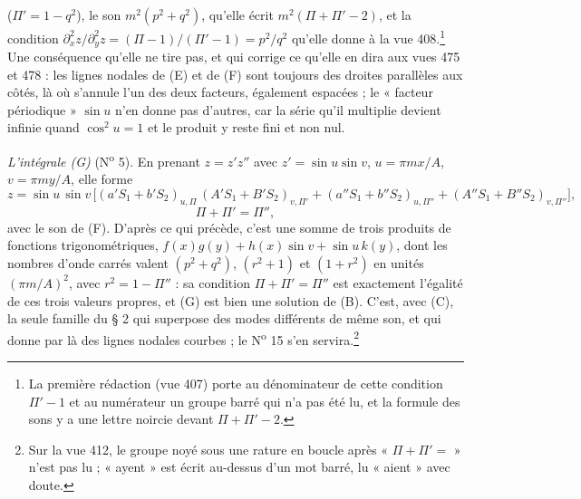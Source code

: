 \documentclass[11pt,a4paper]{article}
\begin{document}
($\Pi' = 1 - q^2$), le son $m^2(p^2+q^2)$, qu'elle écrit $m^2(\Pi+\Pi'-2)$, et la
condition $\partial_x^2 z/\partial_y^2 z = (\Pi-1)/(\Pi'-1) = p^2/q^2$ qu'elle donne à
la vue 408.\footnote{La première rédaction (vue 407) porte au dénominateur de cette
condition $\Pi' - 1$ et au numérateur un groupe barré qui n'a pas été lu, et la
formule des sons y a une lettre noircie devant $\Pi+\Pi'-2$.} Une conséquence qu'elle
ne tire pas, et qui corrige ce qu'elle en dira aux vues 475 et 478 : les lignes
nodales de (E) et de (F) sont toujours des droites parallèles aux côtés, là où
s'annule l'un des deux facteurs, également espacées ; le « facteur périodique »
$\sin u$ n'en donne pas d'autres, car la série qu'il multiplie devient infinie quand
$\cos^2 u = 1$ et le produit y reste fini et non nul.

\emph{L'intégrale (G)} (N\textsuperscript{o} 5). En prenant $z = z'z''$ avec
$z' = \sin u\sin v$, $u = \pi m x/A$, $v = \pi m y/A$, elle forme
\[
z = \sin u\,\sin v\,\Big[(a'S_1 + b'S_2)_{u,\Pi}\,(A'S_1 + B'S_2)_{v,\Pi'}
+ (a''S_1 + b''S_2)_{u,\Pi''} + (A''S_1 + B''S_2)_{v,\Pi''}\Big],
\]
\[
\Pi + \Pi' = \Pi'',
\]
avec le son de (F). D'après ce qui précède, c'est une somme de trois produits de
fonctions trigonométriques, $f(x)g(y) + h(x)\sin v + \sin u\,k(y)$, dont les nombres
d'onde carrés valent $(p^2+q^2)$, $(r^2+1)$ et $(1+r^2)$ en unités $(\pi m/A)^2$, avec
$r^2 = 1 - \Pi''$ : sa condition $\Pi + \Pi' = \Pi''$ est exactement l'égalité de ces
trois valeurs propres, et (G) est bien une solution de (B). C'est, avec (C), la seule famille
du § 2 qui superpose des modes différents de même son, et qui donne par là des lignes
nodales courbes ; le N\textsuperscript{o} 15 s'en servira.\footnote{Sur la vue 412, le
groupe noyé sous une rature en boucle après « $\Pi + \Pi' =$ » n'est pas lu ; « ayent »
est écrit au-dessus d'un mot barré, lu « aient » avec doute.}
\end{document}
